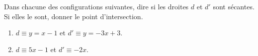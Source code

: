 
\begin{exercice}\label{exosmath-0084}

    Dans chacune des configurations suivantes, dire si les droites \( d\) et \( d'\) sont sécantes. Si elles le sont, donner le point d'intersection.
    \begin{enumerate}
        \item
            \( d\equiv y=x-1\) et \( d'\equiv y=-3x+3\).
        \item
            \( d\equiv 5x-1\) et \( d'\equiv -2x\).
    \end{enumerate}

\end{exercice}
